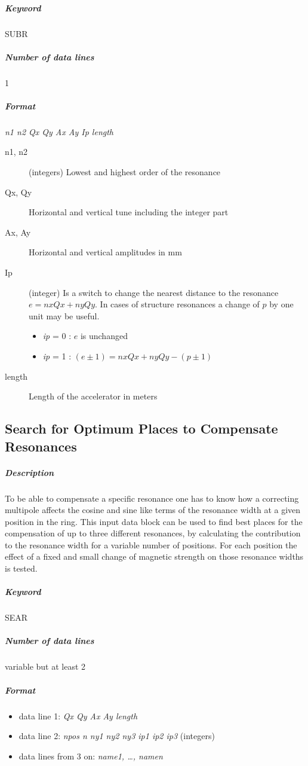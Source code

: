 \subparagraph{Keyword} SUBR \subparagraph{Number of data lines} 1

\subparagraph{Format} {\em n1 n2 Qx Qy Ax Ay Ip length}

\begin{description}
\item [n1, n2] (integers) Lowest and highest order of the resonance
\item [Qx, Qy] Horizontal and vertical tune including the integer part
\item [Ax, Ay] Horizontal and vertical amplitudes in mm
\item [Ip] (integer) Is a switch to change the nearest distance to the
  resonance \mbox{$ e = nxQx + nyQy $.} In cases of structure
  resonances a change of $p$ by one unit may be useful.
 \begin{itemize}
 \item {\em ip} \/= 0 : $e$ is unchanged
 \item {\em ip} \/= 1 : \mbox{$ (e \pm 1) = nxQx + nyQy - (p \pm 1) $}
 \end{itemize}
\item [length] Length of the accelerator in meters
\end{description}

\subsection{Search for Optimum
  Places to Compensate Resonances} \label{SeaPla}

\subparagraph{Description} To be able to compensate a specific
resonance one has to know how a correcting multipole affects the
cosine and sine like terms of the resonance width at a given position
in the ring. This input data block can be used to find best places for
the compensation of up to three different resonances, by calculating
the contribution to the resonance width for a variable number of
positions. For each position the effect of a fixed and small change of
magnetic strength on those resonance widths is tested.

\subparagraph{Keyword} SEAR \subparagraph{Number of data lines}
variable but at least 2

\subparagraph{Format}
\begin{itemize}
\item data line 1: {\em Qx Qy Ax Ay length}
\item data line 2: {\em npos n ny1 ny2 ny3 ip1 ip2 ip3} \/(integers)
\item data lines from 3 on: {\em name1, \dots , namen}
\end{itemize}

